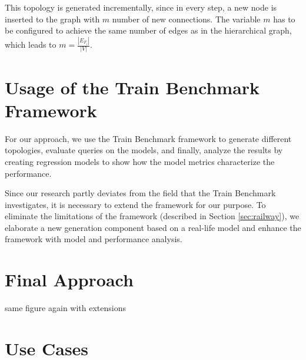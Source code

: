 This topology is generated incrementally, since in every step, a new node is inserted to the graph with $m$ number of new connections. The variable $m$ has to be configured to achieve the same number of edges as in the hierarchical graph, which leads to $m = \frac{|E_{F_i}|}{|V|}$.

\section{Usage of the Train Benchmark Framework}

For our approach, we use the Train Benchmark framework to generate different topologies, evaluate queries on the models, and finally, analyze the results by creating regression models to show how the model metrics characterize the performance.

Since our research partly deviates from the field that the Train Benchmark investigates, it is necessary to extend the framework for our purpose. To eliminate the limitations of the framework (described in Section \ref{sec:railway}), we elaborate a new generation component based on a real-life model and enhance the framework with model and performance analysis.

\section{Final Approach}

same figure again with extensions

\section{Use Cases}